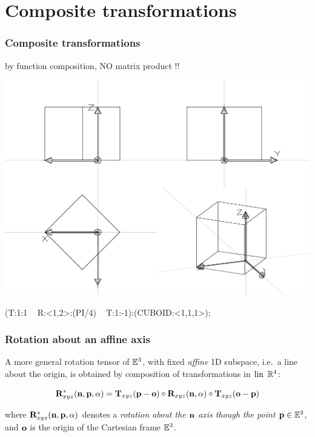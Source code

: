 \documentclass{beamer}
\begin{document}
\section{Composite transformations}
\begin{frame}[fragile]\frametitle{Composite transformations}

by function composition, NO matrix product !!

\vfill
    

\vfill

\centering\includegraphics[width=0.6\linewidth]{figs/cube-trt}
\vfill

\begin{python}
 (T:1:1  ~  R:<1,2>:(PI/4)  ~  T:1:-1):(CUBOID:<1,1,1>);
\end{python}


\end{frame}
\begin{frame}\frametitle{Rotation about an affine axis}

\vfill

A more general rotation tensor of ${\mathbb{E}}^3$, with fixed \emph{affine} 1D subspace, i.e.~a line about the origin, is obtained by \alert{composition of transformations} in $\mbox{\rm lin}\,\ \mathbb{R}^4$:

\vfill
\[
{\bf R}_{xyz}^{*}({\bf n}, {\bf p}, \alpha) =
{\bf T}_{xyz}({\bf p}-{\bf o})\circ {\bf R}_{xyz}({\bf n}, \alpha)\circ {\bf T}_{xyz}({\bf o}-{\bf p})
\]

\vfill

where ${\bf R}_{xyz}^{*}({\bf n}, {\bf p}, \alpha)$ denotes a \emph{rotation about the ${\bf n}$ axis though the point ${\bf p}\in{\mathbb{E}}^3$}, and ${\bf o}$ is the origin of the Cartesian frame ${\mathbb{E}}^3$.

\vfill

\end{frame}
\end{document}
